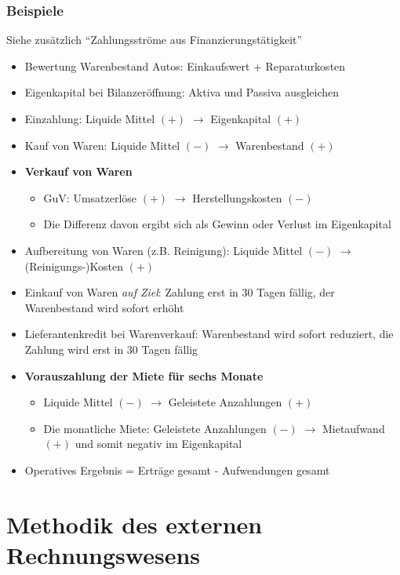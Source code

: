 \subsubsection{Beispiele}
Siehe zusätzlich "`Zahlungsströme aus Finanzierungstätigkeit"'
\begin{itemize}
	\item Bewertung Warenbestand Autos: Einkaufswert + Reparaturkosten
	\item Eigenkapital bei Bilanzeröffnung: Aktiva und Passiva ausgleichen
	\item Einzahlung: Liquide Mittel \((+)\) \(\rightarrow\) Eigenkapital \((+)\)
	\item Kauf von Waren: Liquide Mittel \((-)\) \(\rightarrow\) Warenbestand \((+)\)
	\item \textbf{Verkauf von Waren}
	\begin{itemize}
		\item GuV: Umsatzerlöse \((+)\) \(\rightarrow\) Herstellungskosten \((-)\)
		\item Die Differenz davon ergibt sich als Gewinn oder Verlust im Eigenkapital
	\end{itemize}
	\item Aufbereitung von Waren (z.B. Reinigung): Liquide Mittel \((-)\) \(\rightarrow\) (Reinigungs-)Kosten \((+)\)
	\item Einkauf von Waren \textit{auf Ziel}: Zahlung erst in 30 Tagen fällig, der Warenbestand wird sofort erhöht
	\item Lieferantenkredit bei Warenverkauf: Warenbestand wird sofort reduziert, die Zahlung wird erst in 30 Tagen fällig
	\item \textbf{Vorauszahlung der Miete für sechs Monate}
	\begin{itemize}
		\item Liquide Mittel \((-)\) \(\rightarrow\) Geleistete Anzahlungen \((+)\)
		\item Die monatliche Miete: Geleistete Anzahlungen \((-)\) \(\rightarrow\) Mietaufwand \((+)\) und somit negativ im Eigenkapital
	\end{itemize}
	\item Operatives Ergebnis = Erträge gesamt - Aufwendungen gesamt
\end{itemize}



\section{Methodik des externen Rechnungswesens}


